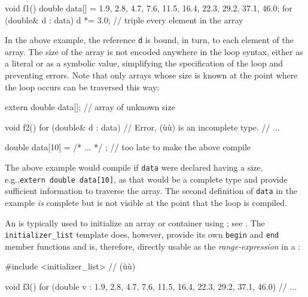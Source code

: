 {{\begin{emcppslisting}
void f1()
{
    double data[] = {1.9, 2.8, 4.7, 7.6, 11.5, 16.4, 22.3, 29.2, 37.1, 46.0};
    for (double& d : data)
    {
        d *= 3.0;  // triple every element in the array
    }
}
\end{emcppslisting}
    

\noindent In the above example, the reference \lstinline!d! is bound, in turn, to
each element of the array. The size of the array is not encoded anywhere
in the loop syntax, either as a literal or as a symbolic value,
simplifying the specification of the loop and preventing errors. Note
that only arrays whose size is known at the point where the loop occurs
can be traversed this way:

\begin{emcppslisting}
extern double data[];  // array of unknown size

void f2()
{
    for (double& d : data)  // Error, (ù{}ù) is an incomplete type.
    {
        // ...
    }
}

double data[10] = { /* ... */ };  // too late to make the above compile
\end{emcppslisting}
    

\noindent The above example would compile if \lstinline!data! were declared having a
size, e.g.,\linebreak[4] \lstinline!extern!~\lstinline!double!~\lstinline!data[10]!, as that
would be a complete type and provide sufficient information to traverse
the array. The second definition of \lstinline!data! in the example
\emph{is} complete but is not visible at the point that the loop is
compiled.

An  is typically used to initialize an array or
container using ; see . The \lstinline!initializer_list! template does,
however, provide its own \lstinline!begin! and \lstinline!end! member
functions and is, therefore, directly usable as the
\emph{range-expression} in a :

\begin{emcppslisting}
#include <initializer_list>  // (ù{}ù)

void f3()
{
    for (double v : {1.9, 2.8, 4.7, 7.6, 11.5, 16.4, 22.3, 29.2, 37.1, 46.0})
    {
        // ...
    }
}
\end{emcppslisting}
    

}}

